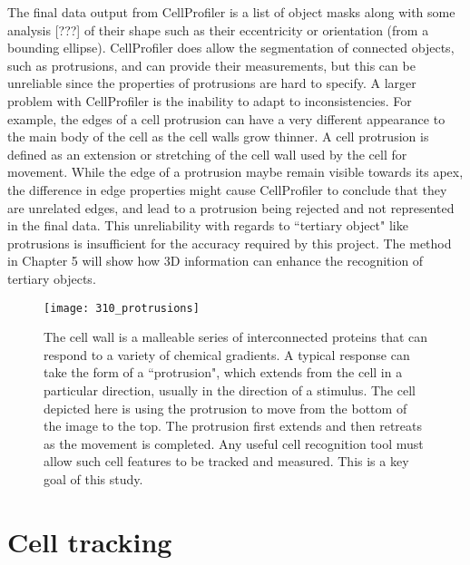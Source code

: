 The final data output from CellProfiler is a list of object masks along with some analysis [???] of their shape such as their eccentricity or orientation (from a bounding ellipse). CellProfiler does allow the segmentation of connected objects, such as protrusions, and can provide their measurements, but this can be unreliable since the properties of protrusions are hard to specify. A larger problem with CellProfiler is the inability to adapt to inconsistencies. For example, the edges of a cell protrusion can have a very different appearance to the main body of the cell as the cell walls grow thinner. A cell protrusion is defined as an extension or stretching of the cell wall used by the cell for movement. While the edge of a protrusion maybe remain visible towards its apex, the difference in edge properties might cause CellProfiler to conclude that they are unrelated edges, and lead to a protrusion being rejected and not represented in the final data. This unreliability with regards to ``tertiary object" like protrusions is insufficient for the accuracy required by this project. The method in Chapter 5 will show how 3D information can enhance the recognition of tertiary objects.

\begin{figure}[h!]
 \centering
 \texttt{[image: 310\_protrusions]}
 \caption[Cell protrusion example]{
 	The cell wall is a malleable series of interconnected proteins that can respond to a variety of chemical gradients. A typical response can take the form of a ``protrusion", which extends from the cell in a particular direction, usually in the direction of a stimulus. The cell depicted here is using the protrusion to move from the bottom of the image to the top. The protrusion first extends and then retreats as the movement is completed. Any useful cell recognition tool must allow such cell features to be tracked and measured. This is a key goal of this study.
 }
 \label{fig:cellprotrusions}
\end{figure}

\section{Cell tracking}

